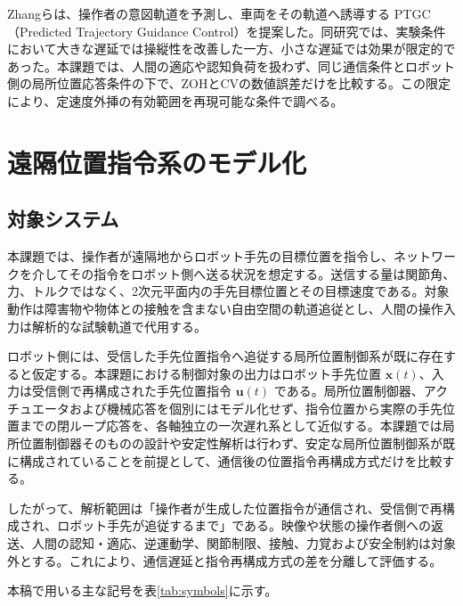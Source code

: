\documentclass[11pt,a4paper]{article}
\newcommand{\vect}[1]{\bm{#1}}
\begin{document}
Zhangら\cite{zhang2023}は、操作者の意図軌道を予測し、車両をその軌道へ誘導する PTGC（Predicted Trajectory Guidance Control）を提案した。同研究では、実験条件において大きな遅延では操縦性を改善した一方、小さな遅延では効果が限定的であった。本課題では、人間の適応や認知負荷を扱わず、同じ通信条件とロボット側の局所位置応答条件の下で、ZOHとCVの数値誤差だけを比較する。この限定により、定速度外挿の有効範囲を再現可能な条件で調べる。

\section{遠隔位置指令系のモデル化}

\subsection{対象システム}

本課題では、操作者が遠隔地からロボット手先の目標位置を指令し、ネットワークを介してその指令をロボット側へ送る状況を想定する。送信する量は関節角、力、トルクではなく、2次元平面内の手先目標位置とその目標速度である。対象動作は障害物や物体との接触を含まない自由空間の軌道追従とし、人間の操作入力は解析的な試験軌道で代用する。

ロボット側には、受信した手先位置指令へ追従する局所位置制御系が既に存在すると仮定する。本課題における制御対象の出力はロボット手先位置 $\vect x(t)$、入力は受信側で再構成された手先位置指令 $\vect u(t)$ である。局所位置制御器、アクチュエータおよび機械応答を個別にはモデル化せず、指令位置から実際の手先位置までの閉ループ応答を、各軸独立の一次遅れ系として近似する。本課題では局所位置制御器そのものの設計や安定性解析は行わず、安定な局所位置制御系が既に構成されていることを前提として、通信後の位置指令再構成方式だけを比較する。

したがって、解析範囲は「操作者が生成した位置指令が通信され、受信側で再構成され、ロボット手先が追従するまで」である。映像や状態の操作者側への返送、人間の認知・適応、逆運動学、関節制限、接触、力覚および安全制約は対象外とする。これにより、通信遅延と指令再構成方式の差を分離して評価する。

本稿で用いる主な記号を表\ref{tab:symbols}に示す。
\end{document}
